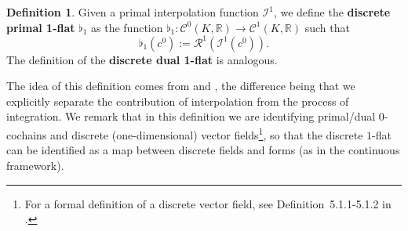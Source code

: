 \documentclass{article}
\theoremstyle{definition} %
\newtheorem{Def}{Definition}
\theoremstyle{plain} %
\theoremstyle{remark} %
\newcommand{\rr}{\mathbb{R}}
\begin{document}
\begin{Def}
    Given a primal interpolation function $\mathcal{I}^1$, we define the \textbf{discrete primal 1-flat} $\flat_1$ as the function $\flat_1: \mathcal{C}^0(K, \rr) \rightarrow \mathcal{C}^1(K, \rr)$ such that
    \begin{equation}
        \flat_1(c^0) := \mathcal{R}^1(\mathcal{I}^1(c^0)).
    \end{equation}
    The definition of the \textbf{discrete dual 1-flat} is analogous.
\end{Def}

The idea of this definition comes from \cite{hirani2003discrete} and \cite{boom2022geometric}, the difference being that we explicitly separate the contribution of interpolation from the process of integration. We remark that in this definition we are identifying primal/dual $0$-cochains and discrete (one-dimensional) vector fields\footnote{For a formal definition of a discrete vector field, see Definition~5.1.1-5.1.2 in \cite{hirani2003discrete}.}, so that the discrete $1$-flat can be identified as a map between discrete fields and forms (as in the continuous framework).
\end{document}
